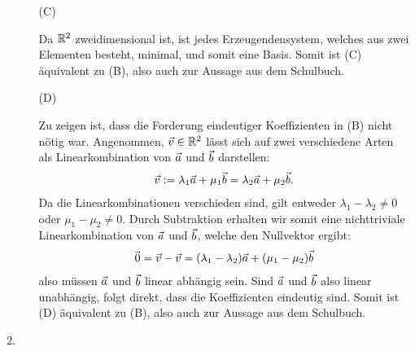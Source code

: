 \documentclass{article}
\begin{document}
\begin{enumerate}
\begin{enumerate}
		\item[(C)] 
		
		Da $\bR^2$ zweidimensional ist, ist jedes Erzeugendensystem, welches aus zwei Elementen besteht, minimal, und somit eine Basis. Somit ist (C) äquivalent zu (B), also auch zur Aussage aus dem Schulbuch.
		
		\item[(D)] 
		
		Zu zeigen ist, dass die Forderung eindeutiger Koeffizienten in (B) nicht nötig war. Angenommen, $\vv \in \bR^2$ lässt sich auf zwei verschiedene Arten als Linearkombination von $\va$ und $\vb$ darstellen:
		\begin{align*}
			\vv := \lambda_1 \va + \mu_1 \vb = \lambda_2 \va + \mu_2 \vb.
		\end{align*} 
		Da die Linearkombinationen verschieden sind, gilt entweder $\lambda_1 - \lambda_2 \neq 0$ oder $\mu_1 - \mu_2 \neq 0$. Durch Subtraktion erhalten wir somit eine nichttriviale Linearkombination von $\va$ und $\vb$, welche den Nullvektor ergibt:
		\begin{align*}
			\vzero = \vv - \vv = (\lambda_1 - \lambda_2) \va + (\mu_1 - \mu_2) \vb
		\end{align*}
		also müssen $\va$ und $\vb$ linear abhängig sein. Sind $\va$ und $\vb$ also linear unabhängig, folgt direkt, dass die Koeffizienten eindeutig sind. Somit ist (D) äquivalent zu (B), also auch zur Aussage aus dem Schulbuch.
	\end{enumerate}
	
	\clearpage
	
	\item {}


\end{enumerate}
\end{document}
